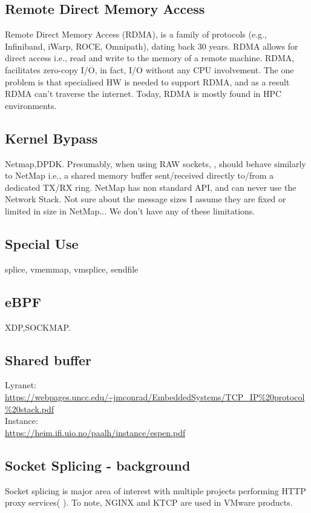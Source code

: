 \subsection{Remote Direct Memory Access}
Remote Direct Memory Access (RDMA), is a family of protocols (e.g., Infiniband\cite{infiniband}, iWarp\cite{iwarp}, ROCE\cite{roce}, Omnipath\cite{omnipath}), dating back 30 years. RDMA allows for direct access i.e., read and write to the memory of a remote machine. RDMA, facilitates zero-copy I/O, in fact, I/O without any CPU involvement. The one problem is that specialised HW is needed to support RDMA, and as a result RDMA can't traverse the internet. Today, RDMA is mostly found in HPC environments\cite{top500}.

\subsection{Kernel Bypass}
Netmap,DPDK.
Presumably, when using RAW sockets, \oursys, should behave similarly to NetMap i.e., a shared memory buffer sent/received directly to/from a dedicated TX/RX ring.
NetMap has non standard API, and can never use the Network Stack. Not sure about the message sizes I assume they are fixed or limited in size in NetMap...
We don't have any of these limitations.

\subsection{Special Use} 
splice, vmemmap, vmsplice, sendfile 

\subsection{eBPF}
XDP,SOCKMAP.

\subsection{Shared buffer}
Lyranet:\\
\url{https://webpages.uncc.edu/~jmconrad/EmbeddedSystems/TCP_IP\%20protocol\%20stack.pdf}\\
Instance:\\
\url{https://heim.ifi.uio.no/paalh/instance/espen.pdf}\\

\subsection{Socket Splicing - background}
Socket splicing is major area of interest with multiple projects performing HTTP proxy services( \cite{squid,HAProxy,varnish,nginx,ktcp}). To note, NGINX\cite{nginx} and KTCP\cite{ktcp} are used in VMware products.


